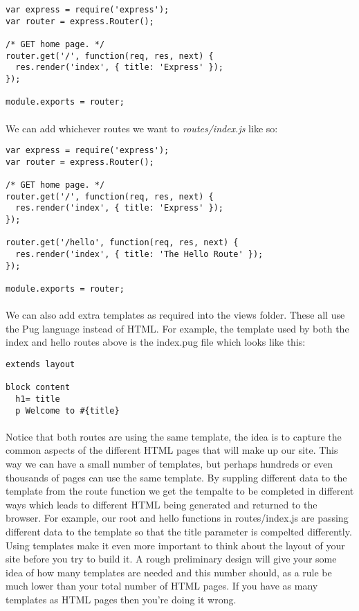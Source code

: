 \documentclass[10pt, a4paper, twosize]{article}
\begin{document}
\begin{lstlisting}
var express = require('express');
var router = express.Router();

/* GET home page. */
router.get('/', function(req, res, next) {
  res.render('index', { title: 'Express' });
});

module.exports = router;
\end{lstlisting}

\paragraph{} We can add whichever routes we want to \emph{routes/index.js} like so:

\begin{lstlisting}
var express = require('express');
var router = express.Router();

/* GET home page. */
router.get('/', function(req, res, next) {
  res.render('index', { title: 'Express' });
});

router.get('/hello', function(req, res, next) {
  res.render('index', { title: 'The Hello Route' });
});

module.exports = router;
\end{lstlisting}

\paragraph{} We can also add extra templates as required into the views folder. These all use the Pug language instead of HTML. For example, the template used by both the index and hello routes above is the index.pug file which looks like this:

\begin{lstlisting}
extends layout

block content
  h1= title
  p Welcome to #{title}
\end{lstlisting}

\paragraph{} Notice that both routes are using the same template, the idea is to capture the common aspects of the different HTML pages that will make up our site. This way we can have a small number of templates, but perhaps hundreds or even thousands of pages can use the same template. By suppling different data to the template from the route function we get the tempalte to be completed in different ways which leads to different HTML being generated and returned to the browser. For example, our root and hello functions in routes/index.js are passing different data to the template so that the title parameter is compelted differently. Using templates make it even more important to think about the layout of your site before you try to build it. A rough preliminary design will give your some idea of how many templates are needed and this number should, as a rule be much lower than your total number of HTML pages. If you have as many templates as HTML pages then you're doing it wrong.
\end{document}
